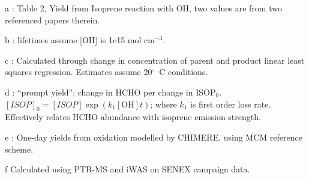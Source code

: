 \begin{table}
\begin{threeparttable}
\begin{tabular}{  l  l  l  l  }
            \bottomrule
          \end{tabular}
          \begin{tablenotes} %
            \item a \textcite{AtkinsonArey2003}: Table 2, Yield from Isoprene reaction with OH, two values are from two referenced papers therein.
            \item b \textcite{Palmer2003}: lifetimes assume [OH] is 1e15 mol cm$^{-3}$.
            \item c \parencite{Lee2006}: Calculated through change in concentration of parent and product linear least squares regression.
            Estimates assume 20$^\circ$~C conditions.
            \item d \textcite{Wolfe2016}: ``prompt yield'': change in HCHO per change in ISOP$_0$.
            $[ISOP]_0=[ISOP]\exp(k_1[\mathrm{OH}]t)$; where $k_1$ is first order loss rate.
            Effectively relates HCHO abundance with isoprene emission strength.
            \item e \textcite{Dufour2009}: One-day yields from oxidation modelled by CHIMERE, using MCM reference scheme.
            \item f Calculated using PTR-MS and iWAS on SENEX campaign data.
          \end{tablenotes}
          \label{BioIsop:Method:tab_VOCLiteratureYields}
        \end{threeparttable} \end{table}


